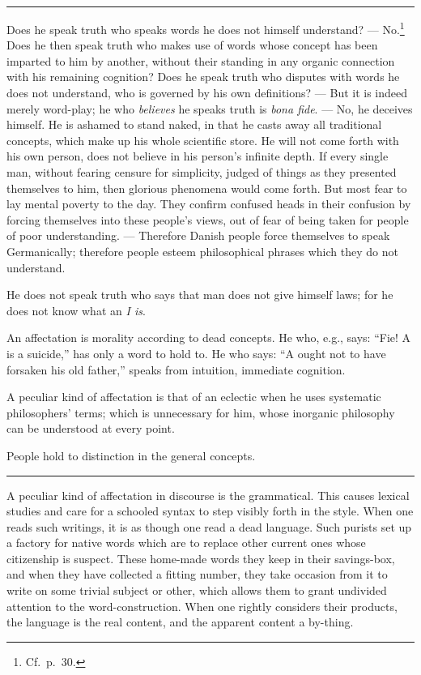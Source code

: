 \documentclass[12pt]{article}
\newcommand{\opage}[1]{\marginnote{\footnotesize\textit{[#1]}}}
\newcommand{\ombreak}{\par\medskip\begin{center}\rule{0.32\textwidth}{0.4pt}\end{center}\medskip}
\begin{document}
\ombreak

Does he speak truth who speaks words he does not himself understand? --- No.\footnote{Cf.\ p.\ 30.} Does he then speak truth who makes use of words whose concept has been imparted to him by another, without their standing in any organic connection with his remaining cognition? Does he speak truth who disputes with words he does not understand, who is governed by his own definitions? --- But it is indeed merely \opage{185}word-play; he who \emph{believes} he speaks truth is \textit{bona fide}. --- No, he deceives himself. He is ashamed to stand naked, in that he casts away all traditional concepts, which make up his whole scientific store. He will not come forth with his own person, does not believe in his person's infinite depth. If every single man, without fearing censure for simplicity, judged of things as they presented themselves to him, then glorious phenomena would come forth. But most fear to lay mental poverty to the day. They confirm confused heads in their confusion by forcing themselves into these people's views, out of fear of being taken for people of poor understanding. --- Therefore Danish people force themselves to speak Germanically; therefore people esteem philosophical phrases which they do not understand.

He does not speak truth who says that man does not give himself laws; for he does not know what an \emph{I is}.

An affectation is morality according to dead concepts. He who, e.g., says: ``Fie! A is a suicide,'' has only a word to hold to. He who says: ``A ought not to have forsaken his old father,'' speaks from intuition, immediate cognition.

A peculiar kind of affectation is that of an eclectic when he uses systematic philosophers' terms; which is unnecessary for him, whose inorganic philosophy can be understood at every point.

People hold to distinction in the general concepts.

\ombreak

A peculiar kind of affectation in discourse is the grammatical. This causes lexical studies and care for \opage{186}a schooled syntax to step visibly forth in the style. When one reads such writings, it is as though one read a dead language. Such purists set up a factory for native words which are to replace other current ones whose citizenship is suspect. These home-made words they keep in their savings-box, and when they have collected a fitting number, they take occasion from it to write on some trivial subject or other, which allows them to grant undivided attention to the word-construction. When one rightly considers their products, the language is the real content, and the apparent content a by-thing.
\end{document}
